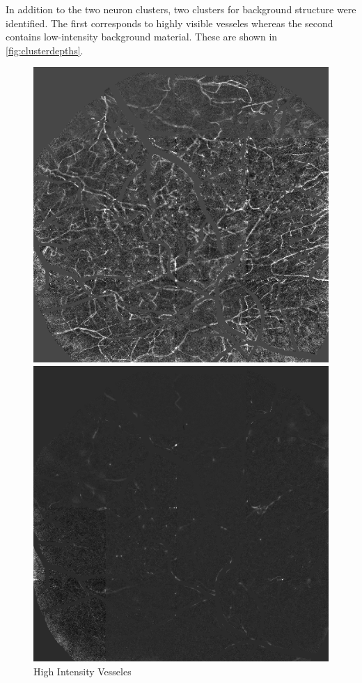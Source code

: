\documentclass[10pt]{article}
\begin{document}
In addition to the two neuron clusters, two clusters for background structure were identified. The first corresponds to highly visible vesseles whereas the second contains low-intensity background material. These are shown in \cref{fig:clusterdepths}.

\begin{figure}[h]
    \centering

    \begin{minipage}{0.23\textwidth}
      \centering
      \includegraphics[width=\textwidth]{figs/vessels_DC.png}
      \caption*{High Intensity Vesseles}
    \end{minipage}
    \begin{minipage}{0.23\textwidth}
      \centering
      \includegraphics[width=\textwidth]{figs/remaining_vesseles.png}

\end{minipage}
\end{figure}
\end{document}
